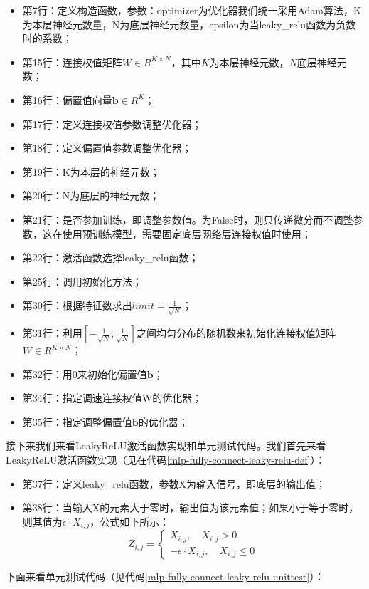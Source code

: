 \documentclass[UTF8]{article}
\begin{document}
\begin{itemize}
\item 第7行：定义构造函数，参数：optimizer为优化器我们统一采用Adam算法，K为本层神经元数量，N为底层神经元数量，epsilon为当leaky\_relu函数为负数时的系数；
\item 第15行：连接权值矩阵$W \in R^{K \times N}$，其中$K$为本层神经元数，$N$底层神经元数；
\item 第16行：偏置值向量$\boldsymbol{b} \in R^{K}$；
\item 第17行：定义连接权值参数调整优化器；
\item 第18行：定义偏置值参数调整优化器；
\item 第19行：K为本层的神经元数；
\item 第20行：N为底层的神经元数；
\item 第21行：是否参加训练，即调整参数值。为False时，则只传递微分而不调整参数，这在使用预训练模型，需要固定底层网络层连接权值时使用；
\item 第22行：激活函数选择leaky\_relu函数；
\item 第25行：调用初始化方法；
\item 第30行：根据特征数求出$limit=\frac{1}{\sqrt{N}}$；
\item 第31行：利用$[ -\frac{1}{\sqrt{N}}, \frac{1}{\sqrt{N}} ]$之间均匀分布的随机数来初始化连接权值矩阵$W \in R^{K \times N}$；
\item 第32行：用0来初始化偏置值$\boldsymbol{b}$；
\item 第34行：指定调速连接权值W的优化器；
\item 第35行：指定调整偏置值$\boldsymbol{b}$的优化器；
\end{itemize}
接下来我们来看LeakyReLU激活函数实现和单元测试代码。我们首先来看LeakyReLU激活函数实现（见在代码\ref{mlp-fully-connect-leaky-relu-def}）：
\begin{itemize}
\item 第37行：定义leaky\_relu函数，参数X为输入信号，即底层的输出值；
\item 第38行：当输入X的元素大于零时，输出值为该元素值；如果小于等于零时，则其值为$\epsilon \cdot X_{i,j}$，公式如下所示：
\begin{equation}
Z_{i,j}=\begin{cases}
X_{i,j}, \quad X_{i,j}>0 \\
-\epsilon \cdot X_{i,j}, \quad X_{i,j} \le 0
\end{cases}
\label{mlp-leaky-relu-func-def}
\end{equation}
\end{itemize}
下面来看单元测试代码（见代码\ref{mlp-fully-connect-leaky-relu-unittest}）：
\end{document}
